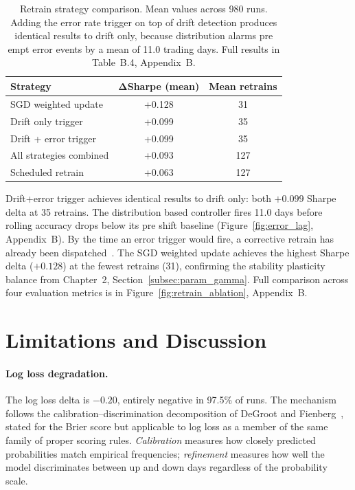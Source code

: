\label{subsec:retrain_ablation}
\begin{table}[htbp]
  \centering
  \caption{Retrain strategy comparison. Mean values across 980 runs. Adding the
    error rate trigger on top of drift detection produces identical results to
    drift only, because distribution alarms pre empt error events by a mean of
    11.0 trading days. Full results in Table~B.4, Appendix~B.}
  \label{tab:retrain_summary}
  \begin{tabular}{lcc}
    \hline
    \textbf{Strategy} & $\bm{\Delta}$\textbf{Sharpe (mean)} & \textbf{Mean retrains} \\
    \hline
    SGD weighted update        & +0.128 & 31 \\
    Drift only trigger         & +0.099 & 35 \\
    Drift + error trigger      & +0.099 & 35 \\
    All strategies combined    & +0.093 & 127 \\
    Scheduled retrain          & +0.063 & 127 \\
    \hline
  \end{tabular}
\end{table}

Drift+error trigger achieves identical results to drift only: both $+0.099$ Sharpe delta at 35 retrains. The distribution based controller fires 11.0 days before rolling accuracy drops below its pre shift baseline (Figure~\ref{fig:error_lag}, Appendix~B). By the time an error trigger would fire, a corrective retrain has already been dispatched~\cite{gama2014survey}. The SGD weighted update achieves the highest Sharpe delta ($+0.128$) at the fewest retrains (31), confirming the stability plasticity balance from Chapter~2, Section~\ref{subsec:param_gamma}. Full comparison across four evaluation metrics is in Figure~\ref{fig:retrain_ablation}, Appendix~B.

\section{Limitations and Discussion}
\label{sec:limitations}

\paragraph{Log loss degradation.}

The log loss delta is $-0.20$, entirely negative in 97.5\% of runs. The mechanism follows the calibration--discrimination decomposition of DeGroot and Fienberg~\cite{degroot1983}, stated for the Brier score but applicable to log loss as a member of the same family of proper scoring rules. \emph{Calibration} measures how closely predicted probabilities match empirical frequencies; \emph{refinement} measures how well the model discriminates between up and down days regardless of the probability scale.

